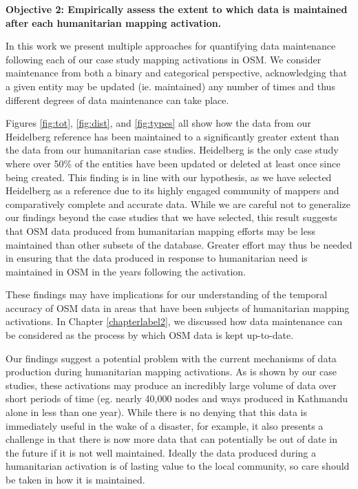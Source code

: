 \noindent\textbf{Objective 2: Empirically assess the extent to which data is maintained after each humanitarian mapping activation.}

In this work we present multiple approaches for quantifying data maintenance following each of our case study mapping activations in OSM. We consider maintenance from both a binary and categorical perspective, acknowledging that a given entity may be updated (ie. maintained) any number of times and thus different degrees of data maintenance can take place. 

Figures \ref{fig:tot}, \ref{fig:dist}, and \ref{fig:types} all show how the data from our Heidelberg reference has been maintained to a significantly greater extent than the data from our humanitarian case studies. Heidelberg is the only case study where over 50\% of the entities have been updated or deleted at least once since being created. This finding is in line with our hypothesis, as we have selected Heidelberg as a reference due to its highly engaged community of mappers and comparatively complete and accurate data. While we are careful not to generalize our findings beyond the case studies that we have selected, this result suggests that OSM data produced from humanitarian mapping efforts may be less maintained than other subsets of the database. Greater effort may thus be needed in ensuring that the data produced in response to humanitarian need is maintained in OSM in the years following the activation. 

These findings may have implications for our understanding of the temporal accuracy of OSM data in areas that have been subjects of humanitarian mapping activations. In Chapter \ref{chapterlabel2}, we discussed how data maintenance can be considered as the process by which OSM data is kept up-to-date. 

Our findings suggest a potential problem with the current mechanisms of data production during humanitarian mapping activations. As is shown by our case studies, these activations may produce an incredibly large volume of data over short periods of time (eg. nearly 40,000 nodes and ways produced in Kathmandu alone in less than one year). While there is no denying that this data is immediately useful in the wake of a disaster, for example, it also presents a challenge in that there is now more data that can potentially be out of date in the future if it is not well maintained. Ideally the data produced during a humanitarian activation is of lasting value to the local community, so care should be taken in how it is maintained.

